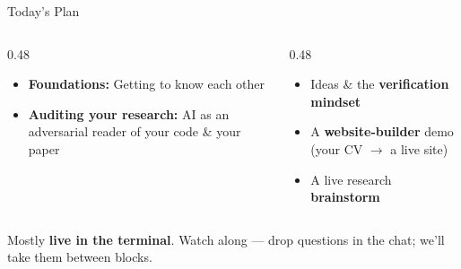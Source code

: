 \documentclass[aspectratio=169, 10pt]{beamer}
\begin{document}
\begin{frame}{Today's Plan}
\vskip2pt
\begin{columns}[T]
\begin{column}{0.48\textwidth}
\begin{tcolorbox}[keybox, title={\faCompass\quad Hour 1 --- Emily}]
\small
\begin{itemize}\setlength{\itemsep}{3pt}
  \item \textbf{Foundations:} Getting to know each other
  \item \textbf{Auditing your research:} AI as an adversarial reader of your code \& your paper
\end{itemize}
\end{tcolorbox}
\end{column}
\begin{column}{0.48\textwidth}
\begin{tcolorbox}[keybox, title={\faComments\quad Hour 2 --- Erkmen}]
\small
\begin{itemize}\setlength{\itemsep}{3pt}
  \item Ideas \& the \textbf{verification mindset}
  \item A \textbf{website-builder} demo (your CV $\rightarrow$ a live site)
  \item A live research \textbf{brainstorm}
\end{itemize}
\end{tcolorbox}
\end{column}
\end{columns}
\vskip8pt
\begin{tcolorbox}[accentbox, halign=center, top=3pt, bottom=3pt]
\small Mostly \textbf{live in the terminal}. Watch along --- drop questions in the chat; we'll take them between blocks.
\end{tcolorbox}
\end{frame}
\end{document}
